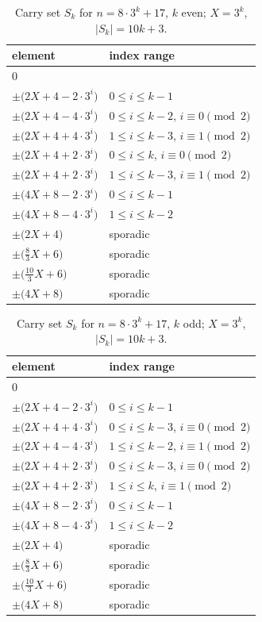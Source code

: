 \begin{table}[htbp]\centering\small
\caption{Carry set $S_k$ for $n=8\cdot 3^k + 17$, $k$ even; $X=3^k$, $|S_k|=10k+3$.}
\label{tab:8p170}
\begin{tabular}{ll}\toprule
element & index range \\ \midrule
$0$ & \\
$\pm\bigl(2X + 4 - 2\cdot 3^i\bigr)$ & $0\le i\le k-1$ \\
$\pm\bigl(2X + 4 - 4\cdot 3^i\bigr)$ & $0\le i\le k-2$, $i\equiv 0\pmod 2$ \\
$\pm\bigl(2X + 4 + 4\cdot 3^i\bigr)$ & $1\le i\le k-3$, $i\equiv 1\pmod 2$ \\
$\pm\bigl(2X + 4 + 2\cdot 3^i\bigr)$ & $0\le i\le k$, $i\equiv 0\pmod 2$ \\
$\pm\bigl(2X + 4 + 2\cdot 3^i\bigr)$ & $1\le i\le k-3$, $i\equiv 1\pmod 2$ \\
$\pm\bigl(4X + 8 - 2\cdot 3^i\bigr)$ & $0\le i\le k-1$ \\
$\pm\bigl(4X + 8 - 4\cdot 3^i\bigr)$ & $1\le i\le k-2$ \\
$\pm\bigl(2X + 4\bigr)$ & sporadic \\
$\pm\bigl(\tfrac{8}{3}X + 6\bigr)$ & sporadic \\
$\pm\bigl(\tfrac{10}{3}X + 6\bigr)$ & sporadic \\
$\pm\bigl(4X + 8\bigr)$ & sporadic \\
\bottomrule\end{tabular}\end{table}

\begin{table}[htbp]\centering\small
\caption{Carry set $S_k$ for $n=8\cdot 3^k + 17$, $k$ odd; $X=3^k$, $|S_k|=10k+3$.}
\label{tab:8p171}
\begin{tabular}{ll}\toprule
element & index range \\ \midrule
$0$ & \\
$\pm\bigl(2X + 4 - 2\cdot 3^i\bigr)$ & $0\le i\le k-1$ \\
$\pm\bigl(2X + 4 + 4\cdot 3^i\bigr)$ & $0\le i\le k-3$, $i\equiv 0\pmod 2$ \\
$\pm\bigl(2X + 4 - 4\cdot 3^i\bigr)$ & $1\le i\le k-2$, $i\equiv 1\pmod 2$ \\
$\pm\bigl(2X + 4 + 2\cdot 3^i\bigr)$ & $0\le i\le k-3$, $i\equiv 0\pmod 2$ \\
$\pm\bigl(2X + 4 + 2\cdot 3^i\bigr)$ & $1\le i\le k$, $i\equiv 1\pmod 2$ \\
$\pm\bigl(4X + 8 - 2\cdot 3^i\bigr)$ & $0\le i\le k-1$ \\
$\pm\bigl(4X + 8 - 4\cdot 3^i\bigr)$ & $1\le i\le k-2$ \\
$\pm\bigl(2X + 4\bigr)$ & sporadic \\
$\pm\bigl(\tfrac{8}{3}X + 6\bigr)$ & sporadic \\
$\pm\bigl(\tfrac{10}{3}X + 6\bigr)$ & sporadic \\
$\pm\bigl(4X + 8\bigr)$ & sporadic \\
\bottomrule\end{tabular}\end{table}

